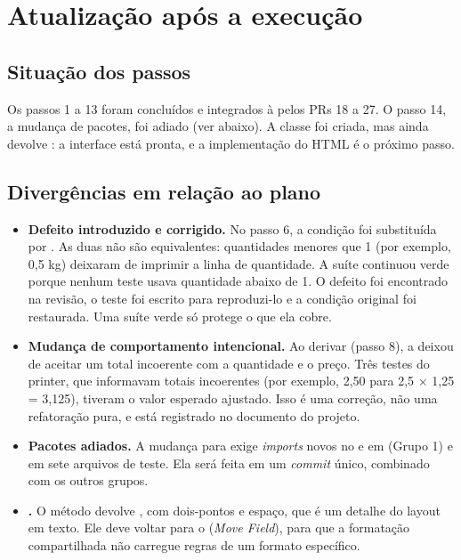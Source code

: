 \section{Atualiza\c{c}\~ao ap\'os a execu\c{c}\~ao}
\subsection{Situa\c{c}\~ao dos passos}
Os passos 1 a 13 foram conclu\'idos e integrados \`a  pelos PRs 18 a 27. O passo 14, a mudan\c{c}a de pacotes, foi adiado (ver abaixo). A classe  foi criada, mas ainda devolve : a interface est\'a pronta, e a implementa\c{c}\~ao do HTML \'e o pr\'oximo passo.

\subsection{Diverg\^encias em rela\c{c}\~ao ao plano}
\begin{itemize}
\item \textbf{Defeito introduzido e corrigido.} No passo 6, a condi\c{c}\~ao  foi substitu\'ida por . As duas n\~ao s\~ao equivalentes: quantidades menores que 1 (por exemplo, 0,5 kg) deixaram de imprimir a linha de quantidade. A su\'ite continuou verde porque nenhum teste usava quantidade abaixo de 1. O defeito foi encontrado na revis\~ao, o teste  foi escrito para reproduzi-lo e a condi\c{c}\~ao original foi restaurada. Uma su\'ite verde s\'o protege o que ela cobre.
\item \textbf{Mudan\c{c}a de comportamento intencional.} Ao derivar  (passo 8), a  deixou de aceitar um total incoerente com a quantidade e o pre\c{c}o. Tr\^es testes do printer, que informavam totais incoerentes (por exemplo, 2,50 para 2,5 $\times$ 1,25 = 3,125), tiveram o valor esperado ajustado. Isso \'e uma corre\c{c}\~ao, n\~ao uma refatora\c{c}\~ao pura, e est\'a registrado no documento do projeto.
\item \textbf{Pacotes adiados.} A mudan\c{c}a para  exige \textit{imports} novos no  e em  (Grupo 1) e em sete arquivos de teste. Ela ser\'a feita em um \textit{commit} \'unico, combinado com os outros grupos.
\item \textbf{.} O m\'etodo devolve , com dois-pontos e espa\c{c}o, que \'e um detalhe do layout em texto. Ele deve voltar para o  (\textit{Move Field}), para que a formata\c{c}\~ao compartilhada n\~ao carregue regras de um formato espec\'ifico.
\end{itemize}


